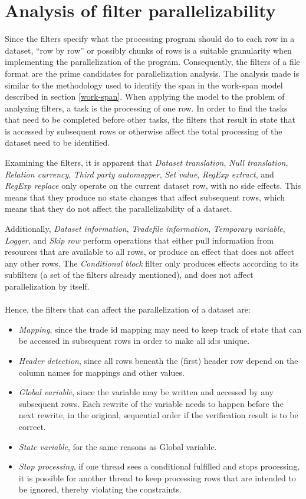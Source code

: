 \section{Analysis of filter parallelizability}
Since the filters specify what the processing program should do to each row in a dataset, ``row by row'' or possibly chunks of rows is a suitable
granularity when implementing the parallelization of the program. Consequently, the filters of a file format are the prime candidates
for parallelization analysis. The analysis made is similar to the methodology used to identify the span in the work-span model described in
section \ref{work-span}. When applying the model to the problem of analyzing filters, a task is the processing of one row. In order to find
the tasks that need to be completed before other tasks, the filters that result in state that is accessed by subsequent rows or otherwise
affect the total processing of the dataset need to be identified.

Examining the filters, it is apparent that \textit{Dataset translation}, \textit{Null translation}, \textit{Relation currency},
\textit{Third party automapper}, \textit{Set value}, \textit{RegExp extract}, and \textit{RegExp replace} only operate on the current dataset row, with no side effects.
This means that they produce no state changes that affect subsequent rows, which means that they do not affect the parallelizability of a dataset.

Additionally, \textit{Dataset information}, \textit{Tradefile information}, \textit{Temporary variable}, \textit{Logger}, and \textit{Skip row} perform
operations that either pull information from resources that are available to all rows, or produce an effect that does not affect any other rows.
The \textit{Conditional block} filter only produces effects according to its subfilters (a set of the filters already mentioned), and does not affect parallelization by itself.
\\\\
Hence, the filters that can affect the parallelization of a dataset are:
\begin{itemize}
  \item \textit{Mapping}, since the trade id mapping may need to keep track of state that can be accessed in subsequent rows in order to make all id:s unique.
  \item \textit{Header detection}, since all rows beneath the (first) header row depend on the column names for mappings and other values.
  \item \textit{Global variable}, since the variable may be written and accessed by any subsequent rows. Each rewrite of the variable needs to happen before the next rewrite,
    in the original, sequential order if the verification result is to be correct.
  \item \textit{State variable}, for the same reasons as Global variable.
  \item \textit{Stop processing}, if one thread sees a conditional fulfilled and stops processing, it is possible for another thread to keep processing rows that are intended
    to be ignored, thereby violating the constraints.
\end{itemize}



